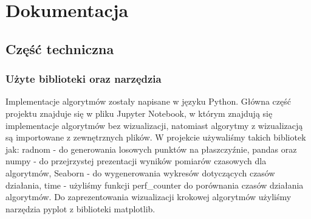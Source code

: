 \documentclass[a4paper,11pt]{article}
\begin{document}
\newpage

\tableofcontents


\newpage

\section{Dokumentacja}

\subsection{Część techniczna}

\subsubsection{Użyte biblioteki oraz narzędzia}
Implementacje algorytmów zostały napisane w języku Python. Główna część projektu znajduje się w pliku Jupyter Notebook, w którym znajdują się implementacje algorytmów bez wizualizacji, natomiast algorytmy z wizualizacją są importowane z zewnętrznych plików. W projekcie używaliśmy takich bibliotek jak: radnom - do generowania losowych punktów na płaszczyźnie,  pandas oraz numpy - do przejrzystej prezentacji wyników pomiarów czasowych dla algorytmów, Seaborn - do wygenerowania wykresów dotyczących czasów działania, time - użyliśmy funkcji perf_counter do porównania czasów działania algorytmów. Do zaprezentowania wizualizacji krokowej algorytmów użyliśmy narzędzia pyplot z biblioteki matplotlib.
\end{document}
